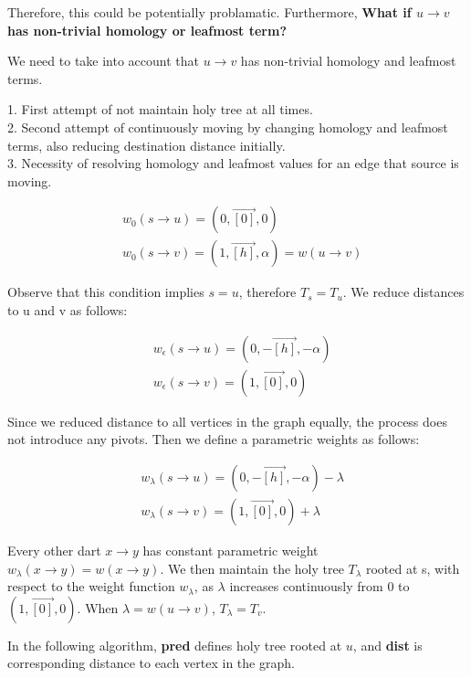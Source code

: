 \documentclass{article}
\begin{document}
Therefore, this could be potentially problamatic. Furthermore, \textbf{What if 
$u \rightarrow v$ has non-trivial homology or leafmost term?}

We need to take into account that $u \rightarrow v$ has non-trivial homology and
leafmost terms. 
\begin{center}
{\color{red}
1. First attempt of not maintain holy tree at all times.
\\
2. Second attempt of continuously moving by changing homology and 
leafmost terms, also reducing destination distance initially.
\\ 
3. Necessity of resolving homology and leafmost values for an edge 
that source is moving.}
\end{center}

\begin{align}
& w_{0}(s \rightarrow u) = ( 0, \vec{[0]}, 0 ) \\
& w_{0}(s \rightarrow v) = ( 1, \vec{[h]}, \alpha ) = w(u \rightarrow v)
\end{align}

Observe that this condition implies $s = u$, therefore $T_s = T_u$. We reduce 
distances to u and v as follows:

\begin{align}
& w_{\epsilon}(s \rightarrow u) = ( 0, -\vec{[h]}, -\alpha ) \\ 
& w_{\epsilon}(s \rightarrow v) = ( 1, \vec{[0]}, 0 )
\end{align}

Since we reduced distance to all vertices in the graph equally, the process does
not introduce any pivots. Then we define a parametric weights as follows:

\begin{align}
& w_{\lambda}(s \rightarrow u) = ( 0, -\vec{[h]}, -\alpha ) - \lambda \\
& w_{\lambda}(s \rightarrow v) = ( 1, \vec{[0]}, 0 )  + \lambda 
\end{align}

Every other dart $x \rightarrow y$ has constant parametric weight 
$w_{\lambda}(x \rightarrow y) = w(x \rightarrow y)$.
We then maintain the holy tree $T_{\lambda}$ rooted at s, with respect
to the weight function $w_{\lambda}$, as $\lambda$ increases continuously from
0 to $( 1, \vec{[0]}, 0 )$. When $\lambda = w(u \rightarrow v)$, 
$T_{\lambda} = T_v$.

In the following algorithm, \textbf{pred} defines holy tree rooted at $u$, and 
\textbf{dist} is corresponding distance to each vertex in the graph. \\
\end{document}
